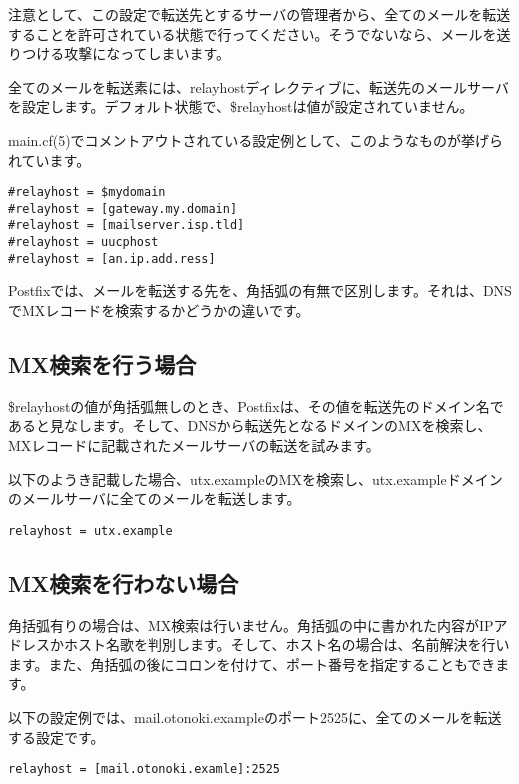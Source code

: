 {注意として、この設定で転送先とするサーバの管理者から、全てのメールを転送することを許可されている状態で行ってください。そうでないなら、メールを送りつける攻撃になってしまいます。

全てのメールを転送素には、relayhostディレクティブに、転送先のメールサーバを設定します。デフォルト状態で、\$relayhostは値が設定されていません。

main.cf(5)でコメントアウトされている設定例として、このようなものが挙げられています。

\begin{lstlisting}[basicstyle=\ttfamily\footnotesize, frame=single]
#relayhost = $mydomain
#relayhost = [gateway.my.domain]
#relayhost = [mailserver.isp.tld]
#relayhost = uucphost
#relayhost = [an.ip.add.ress]
\end{lstlisting}

Postfixでは、メールを転送する先を、角括弧の有無で区別します。それは、DNSでMXレコードを検索するかどうかの違いです。

\subsection{MX検索を行う場合}
\$relayhostの値が角括弧無しのとき、Postfixは、その値を転送先のドメイン名であると見なします。そして、DNSから転送先となるドメインのMXを検索し、MXレコードに記載されたメールサーバの転送を試みます。

以下のようき記載した場合、utx.exampleのMXを検索し、utx.exampleドメインのメールサーバに全てのメールを転送します。

\begin{lstlisting}[basicstyle=\ttfamily\footnotesize, frame=single]
relayhost = utx.example
\end{lstlisting}

\subsection{MX検索を行わない場合}
角括弧有りの場合は、MX検索は行いません。角括弧の中に書かれた内容がIPアドレスかホスト名歌を判別します。そして、ホスト名の場合は、名前解決を行います。また、角括弧の後にコロンを付けて、ポート番号を指定することもできます。

以下の設定例では、mail.otonoki.exampleのポート2525に、全てのメールを転送する設定です。

\begin{lstlisting}[basicstyle=\ttfamily\footnotesize, frame=single]
relayhost = [mail.otonoki.examle]:2525
\end{lstlisting}



}
